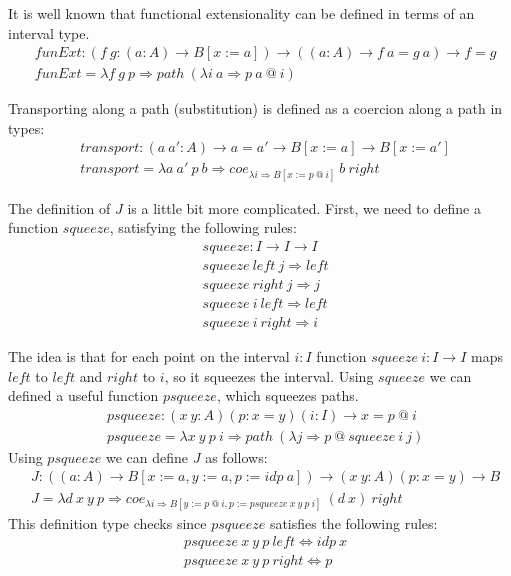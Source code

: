\documentclass{amsart}
\theoremstyle{definition}
\theoremstyle{remark}
\newcommand{\red}{\Rightarrow}
\newcommand{\deq}{\Leftrightarrow}
\numberwithin{figure}{section}
\begin{document}
It is well known that functional extensionality can be defined in terms of an interval type.
\begin{align*}
    & funExt : (f\ g : (a : A) \to B[x := a]) \to ((a : A) \to f\ a = g\ a) \to f = g \\
    & funExt = \lambda f\ g\ p \red path\ (\lambda i\ a \red p\ a\ @\ i)
\end{align*}

Transporting along a path (substitution) is defined as a coercion along a path in types:
\begin{align*}
    & transport : (a\ a' : A) \to a = a' \to B[x := a] \to B[x := a'] \\
    & transport = \lambda a\ a'\ p\ b \red coe_{\lambda i \red B[x := p\ @\ i]}\ b\ right
\end{align*}

The definition of $J$ is a little bit more complicated.
First, we need to define a function $squeeze$, satisfying the following rules:
\begin{align*}
    & squeeze : I \to I \to I \\
    & squeeze\ left\ j \red left \\
    & squeeze\ right\ j \red j \\
    & squeeze\ i\ left \red left \\
    & squeeze\ i\ right \red i
\end{align*}

The idea is that for each point on the interval $i : I$ function $squeeze\ i : I \to I$ maps $left$ to $left$ and $right$ to $i$, so it squeezes the interval.
Using $squeeze$ we can defined a useful function $psqueeze$, which squeezes paths.
\begin{align*}
    & psqueeze : (x\ y : A) (p : x = y) (i : I) \to x = p\ @\ i \\
    & psqueeze = \lambda x\ y\ p\ i \red path\ (\lambda j \red p\ @\ squeeze\ i\ j)
\end{align*}
Using $psqueeze$ we can define $J$ as follows:
\begin{align*}
    & J : ((a : A) \to B[x := a, y := a, p := idp\ a]) \to (x\ y : A) (p : x = y) \to B \\
    & J = \lambda d\ x\ y\ p \red coe_{\lambda i \red B[y := p\ @\ i, p := psqueeze\ x\ y\ p\ i]}\ (d\ x)\ right
\end{align*}
This definition type checks since $psqueeze$ satisfies the following rules:
\begin{align*}
    & psqueeze\ x\ y\ p\ left \deq idp\ x \\
    & psqueeze\ x\ y\ p\ right \deq p
\end{align*}
\end{document}
